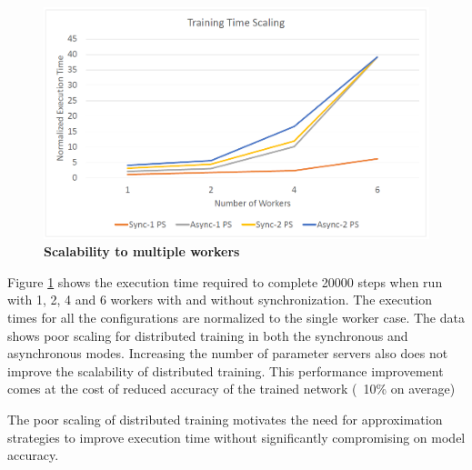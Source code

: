 \begin{figure}[h]
\centering
  \includegraphics[keepaspectratio,width=\columnwidth]{figures/scaling_train_time.PNG}
  \caption{\textbf{Scalability to multiple workers}}
  \label{fig:scalability}
\end{figure}

Figure \ref{fig:scalability} shows the execution time required 
to complete 20000 steps when run with 1, 2, 4 and 6 workers with
and without synchronization. The 
execution times for all the configurations are normalized to 
the single worker case. The data shows poor scaling for distributed
training in both the synchronous and asynchronous modes. Increasing
the number of parameter servers also does not improve the scalability
of distributed training.
This performance improvement
comes at the cost of reduced accuracy of the trained network (~10\%
on average)

The poor scaling of distributed training motivates the need for
approximation strategies to improve execution time without 
significantly compromising on model accuracy.

